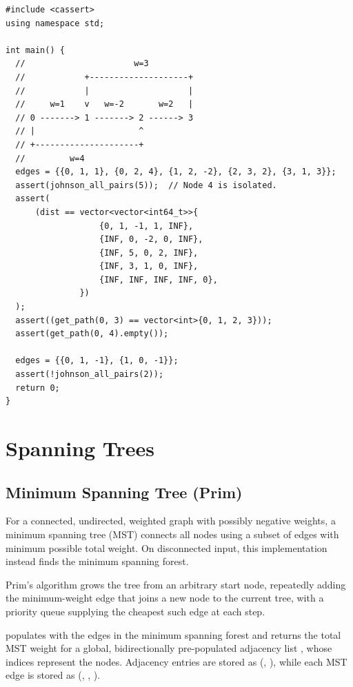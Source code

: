 \begin{lstlisting}[style=cpp]
#include <cassert>
using namespace std;

int main() {
  //                      w=3
  //            +--------------------+
  //            |                    |
  //     w=1    v   w=-2       w=2   |
  // 0 -------> 1 -------> 2 ------> 3
  // |                     ^
  // +---------------------+
  //         w=4
  edges = {{0, 1, 1}, {0, 2, 4}, {1, 2, -2}, {2, 3, 2}, {3, 1, 3}};
  assert(johnson_all_pairs(5));  // Node 4 is isolated.
  assert(
      (dist == vector<vector<int64_t>>{
                   {0, 1, -1, 1, INF},
                   {INF, 0, -2, 0, INF},
                   {INF, 5, 0, 2, INF},
                   {INF, 3, 1, 0, INF},
                   {INF, INF, INF, INF, 0},
               })
  );
  assert((get_path(0, 3) == vector<int>{0, 1, 2, 3}));
  assert(get_path(0, 4).empty());

  edges = {{0, 1, -1}, {1, 0, -1}};
  assert(!johnson_all_pairs(2));
  return 0;
}
\end{lstlisting}

\section{\texorpdfstring{Spanning Trees}{4.4 Spanning Trees}}
\setcounter{section}{4}
\setcounter{subsection}{0}
\subsection{Minimum Spanning Tree (Prim)}
\label{sec:4.4.1}
For a connected, undirected, weighted graph with possibly negative weights, a minimum spanning tree (MST) connects all nodes using a subset of edges with minimum possible total weight. On disconnected input, this implementation instead finds the minimum spanning forest.

Prim's algorithm grows the tree from an arbitrary start node, repeatedly adding the minimum-weight edge that joins a new node to the current tree, with a priority queue supplying the cheapest such edge at each step.

\begin{compactitem}
  \item {} populates  with the edges in the minimum spanning forest and returns the total MST weight for a global, bidirectionally pre-populated adjacency list , whose indices represent the nodes. Adjacency entries are stored as (, ), while each MST edge is stored as (, , ).
\end{compactitem}

